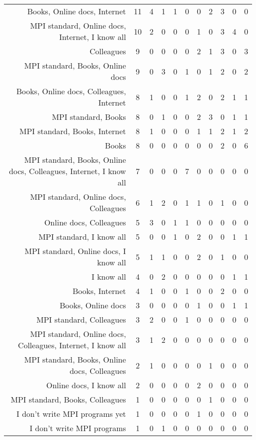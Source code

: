 {\begin{landscape}
\begin{longtable}[htb]{r|c|c|c|c|c|c|c|c|c|c}
{Books, Online docs, Internet} & 11 & 4 & 1 & 1 & 0 & 0 & 2 & 3 & 0 & 0 \\%
{MPI standard, Online docs, Internet, I know all} & 10 & 2 & 0 & 0 & 0 & 1 & 0 & 3 & 4 & 0 \\%
{Colleagues} & 9 & 0 & 0 & 0 & 0 & 2 & 1 & 3 & 0 & 3 \\%
{MPI standard, Books, Online docs} & 9 & 0 & 3 & 0 & 1 & 0 & 1 & 2 & 0 & 2 \\%
{Books, Online docs, Colleagues, Internet} & 8 & 1 & 0 & 0 & 1 & 2 & 0 & 2 & 1 & 1 \\%
{MPI standard, Books} & 8 & 0 & 1 & 0 & 0 & 2 & 3 & 0 & 1 & 1 \\%
{MPI standard, Books, Internet} & 8 & 1 & 0 & 0 & 0 & 1 & 1 & 2 & 1 & 2 \\%
{Books} & 8 & 0 & 0 & 0 & 0 & 0 & 0 & 2 & 0 & 6 \\%
{MPI standard, Books, Online docs, Colleagues, Internet, I know all} & 7 & 0 & 0 & 0 & 7 & 0 & 0 & 0 & 0 & 0 \\%
{MPI standard, Online docs, Colleagues} & 6 & 1 & 2 & 0 & 1 & 1 & 0 & 1 & 0 & 0 \\%
{Online docs, Colleagues} & 5 & 3 & 0 & 1 & 1 & 0 & 0 & 0 & 0 & 0 \\%
{MPI standard, I know all} & 5 & 0 & 0 & 1 & 0 & 2 & 0 & 0 & 1 & 1 \\%
{MPI standard, Online docs, I know all} & 5 & 1 & 1 & 0 & 0 & 2 & 0 & 1 & 0 & 0 \\%
{I know all} & 4 & 0 & 2 & 0 & 0 & 0 & 0 & 0 & 1 & 1 \\%
{Books, Internet} & 4 & 1 & 0 & 0 & 1 & 0 & 0 & 2 & 0 & 0 \\%
{Books, Online docs} & 3 & 0 & 0 & 0 & 0 & 1 & 0 & 0 & 1 & 1 \\%
{MPI standard, Colleagues} & 3 & 2 & 0 & 0 & 1 & 0 & 0 & 0 & 0 & 0 \\%
{MPI standard, Online docs, Colleagues, Internet, I know all} & 3 & 1 & 2 & 0 & 0 & 0 & 0 & 0 & 0 & 0 \\%
{MPI standard, Books, Online docs, Colleagues} & 2 & 1 & 0 & 0 & 0 & 0 & 1 & 0 & 0 & 0 \\%
{Online docs, I know all} & 2 & 0 & 0 & 0 & 0 & 2 & 0 & 0 & 0 & 0 \\%
{MPI standard, Books, Colleagues} & 1 & 0 & 0 & 0 & 0 & 0 & 1 & 0 & 0 & 0 \\%
{I don't write MPI programs yet} & 1 & 0 & 0 & 0 & 0 & 1 & 0 & 0 & 0 & 0 \\%
{I don't write MPI programs} & 1 & 0 & 1 & 0 & 0 & 0 & 0 & 0 & 0 & 0 \\%

\end{longtable}
\end{landscape}}
